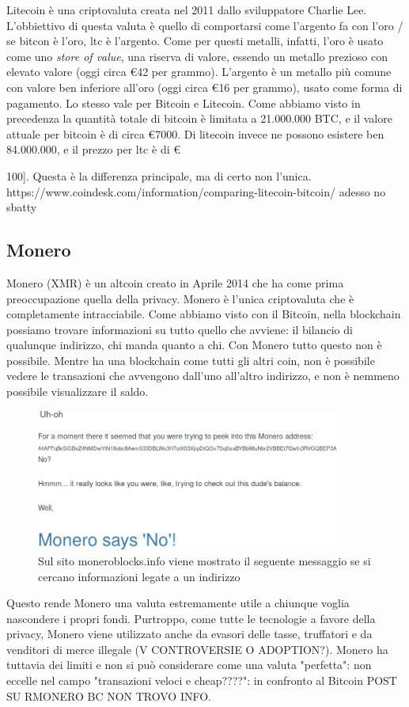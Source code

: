 \documentclass {article}
\begin{document}
Litecoin è una criptovaluta creata nel 2011 dallo sviluppatore Charlie Lee. L'obbiettivo di questa valuta è quello di comportarsi come l'argento fa con l'oro  /  se bitcon è l'oro, ltc è l'argento.
Come per questi metalli, infatti, l'oro è usato come uno \textit{store of value}, una riserva di valore, essendo un metallo prezioso con elevato valore (oggi circa \euro{42} per grammo). L'argento è un metallo più comune con valore ben inferiore all'oro (oggi circa \euro{16} per grammo), usato come forma di pagamento.
Lo stesso vale per Bitcoin e Litecoin. Come abbiamo visto in precedenza la quantità totale di bitcoin è limitata a 21.000.000 BTC, e il valore attuale per bitcoin è di circa \euro{7000}. Di litecoin invece ne possono esistere ben 84.000.000, e il prezzo per ltc è di \euro{100].
Questa è la differenza principale, ma di certo non l'unica.
https://www.coindesk.com/information/comparing-litecoin-bitcoin/ adesso no sbatty


\subsection {Monero}


Monero (XMR) è un altcoin creato in Aprile 2014 che ha come prima preoccupazione quella della privacy.
Monero è l'unica criptovaluta che è completamente intracciabile. Come abbiamo visto con il Bitcoin, nella blockchain possiamo trovare informazioni su tutto quello che avviene: il bilancio di qualunque indirizzo, chi manda quanto a chi.
Con Monero tutto questo non è possibile. Mentre ha una blockchain come tutti gli altri coin, non è possibile vedere le transazioni che avvengono dall'uno all'altro indirizzo, e non è nemmeno possibile visualizzare il saldo.

\vspace {0.5cm}
\begin {figure}[h]
\includegraphics [width = 10cm] {monero.png}
\caption {Sul sito moneroblocks.info viene mostrato il seguente messaggio se si cercano informazioni legate a un indirizzo}
\end {figure}
\vspace {0.5cm}
%
Questo rende Monero una valuta estremamente utile a chiunque voglia nascondere i propri fondi.
Purtroppo, come tutte le tecnologie a favore della privacy, Monero viene utilizzato anche da evasori delle tasse, truffatori e da venditori di merce illegale (V CONTROVERSIE O ADOPTION?).
Monero ha tuttavia dei limiti e non si può considerare come una valuta "perfetta": non eccelle nel campo "transazioni veloci e cheap????": in confronto al Bitcoin POST SU RMONERO BC NON TROVO INFO.


}
\end{document}
